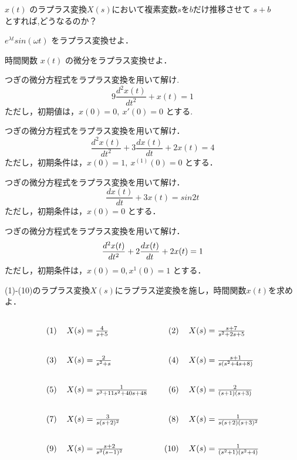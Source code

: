 \documentclass[a4paper,12pt]{article}
\begin{document}
\noindent
[9]  \( x(t) \) のラプラス変換\( X(s) \)において複素変数\(s\)を\(b\)だけ推移させて \(s+b\) \\
\quad とすれば,どうなるのか？ \\
\vspace{10mm}


\noindent
[10] \( e^{\lambda t} sin(\omega t) \) をラプラス変換せよ．\\
\vspace{10mm}

\newpage

\noindent
[11] 時間関数 \( x(t) \) の微分をラプラス変換せよ．\\
\vspace{10mm}


\noindent
[12] つぎの微分方程式をラプラス変換を用いて解け.
\[
    9 \frac{d^2 x(t)}{dt^2} + x(t) = 1 
\]
\quad ただし，初期値は，$x(0) = 0,\ x'(0) = 0$ とする.\\
\vspace{10mm}


\noindent
[13] つぎの微分方程式をラプラス変換を用いて解け．\\
\[
\frac{d^2 x(t)}{dt^2} + 3 \frac{dx(t)}{dt} + 2x(t) = 4
\]
\quad ただし，初期条件は，$x(0)=1,\ x^{(1)}(0)=0$ とする．\\
\vspace{10mm}


\noindent
[14] つぎの微分方程式をラプラス変換を用いて解け．\\
\[
\frac{dx(t)}{dt} + 3x(t) = sin{2t}
\]
\quad ただし，初期条件は，$x(0)=0$ とする．\\
\vspace{10mm}


\noindent
[15] つぎの微分方程式をラプラス変換を用いて解け．\\
\[
\frac{d^2 x(t)}{dt^2} + 2\frac{dx(t)}{dt} + 2x(t) = 1 \\
\]
\quad ただし，初期条件は，$x(0)=0 , x^{1}(0)=1$ とする．\\
\vspace{10mm}

\newpage


\noindent
[16] (1)-(10)のラプラス変換$X(s)$にラプラス逆変換を施し，時間関数$x(t)$を求めよ．\\
\[
\renewcommand{\arraystretch}{3.0} %
\begin{tabular}{@{}rl@{\quad\quad}rl@{}}
(1) & $X(s)=\frac{4}{s+5}$                          &(2) & $X(s)=\frac{ s + 7 }{ s^2 + 2s + 5}$ \\
(3) & $X(s)=\frac{ 2 }{ s^2 + s }$                  &(4) & $X(s)=\frac{ s + 1 }{ s ( s^2 + 4s + 8 )}$ \\
(5) & $X(s)=\frac{ 1 }{ s^3 + 11 s^2+ 40s + 48 }$   &(6) & $X(s)=\frac{ 2 }{ ( s + 1 ) ( s + 3 ) }$ \\
(7) & $X(s)=\frac{ 3 }{ s ( s + 2)^2 }$             &(8) & $X(s)=\frac{ 1 }{ s ( s + 2 ) ( s + 3 )^2 }$ \\
(9) & $X(s)=\frac{ s + 2 }{s^3 ( s - 1 )^2 }$       &(10)& $X(s)=\frac{ 1 }{ ( s^2 + 1 ) ( s^2 + 4 ) }$ \\
\end{tabular}
\]
\vspace{10mm}
\end{document}
